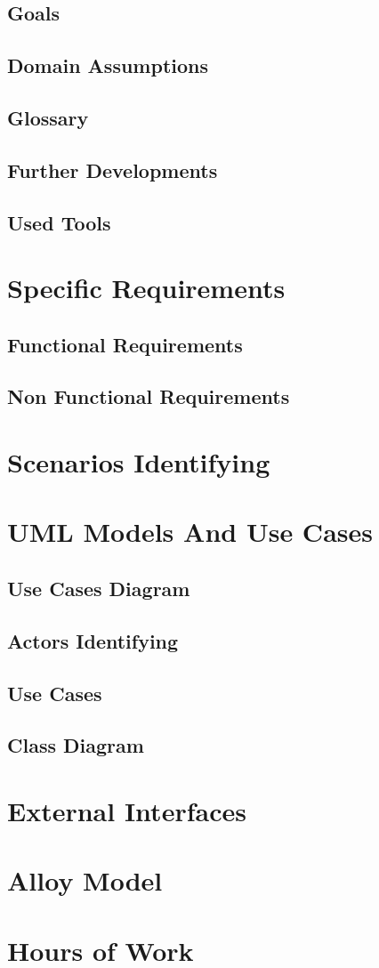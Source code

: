 \documentclass[english]{article}
\begin{document}
	\subsection{Goals}
	\subsection{Domain Assumptions }
	\subsection{Glossary}
	\subsection{Further Developments }
	\subsection{Used Tools}

\section{Specific Requirements}
	\subsection{Functional Requirements}
	\subsection{Non Functional Requirements}

\section{Scenarios Identifying}
\section{UML Models And Use Cases}
	\subsection{Use Cases Diagram}
	\subsection{Actors Identifying}
	\subsection{Use Cases}

	\subsection{Class Diagram}
\section{External Interfaces}
\section{Alloy Model}
\section{Hours of Work}
\end{document}
